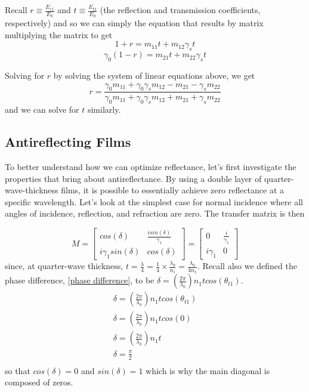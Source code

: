 Recall $r \equiv \frac{E_{r1}}{E_0}$ and $t \equiv \frac{E_{t2}}{E_0}$ (the reflection and transmission coefficients, respectively) and so we can simply the equation that results by matrix multiplying the matrix to get
\begin{equation}
1 + r = m_{11}t + m_{12}\gamma_st
\end{equation}
\begin{equation}
\gamma_0(1 - r) = m_{21}t + m_{22}\gamma_st
\end{equation}

Solving for $r$ by solving the system of linear equations above, we get
\begin{equation}\label{reflection coefficient in terms of transfer matrix terms}
r=\frac{\gamma_0m_{11} + \gamma_0\gamma_sm_{12} - m_{21} - \gamma_sm_{22}}{\gamma_0m_{11} + \gamma_0\gamma_sm_{12} + m_{21} + \gamma_sm_{22}}
\end{equation}
and we can solve for $t$ similarly.

\subsection{Antireflecting Films}
To better understand how we can optimize reflectance, let's first investigate the properties that bring about antireflectance. By using a double layer of quarter-wave-thickness films, it is possible to essentially achieve zero reflectance at a specific wavelength. Let's look at the simplest case for normal incidence where all angles of incidence, reflection, and refraction are zero. The transfer matrix is then

\[
M = 
    \begin{bmatrix}
    cos(\delta) & \frac{isin(\delta)}{\gamma_1}    \\
    i\gamma_1sin(\delta) & cos(\delta)
    \end{bmatrix} = 
    \begin{bmatrix}
    0 & \frac{i}{\gamma_1}  \\
    i\gamma_1 & 0
  \end{bmatrix}
\]
since, at quarter-wave thickness, $t=\frac{\lambda}{4} = \frac{1}{4} \times \frac{\lambda_0}{n_1} = \frac{\lambda_0}{4n_1}$. Recall also we defined the phase difference, \ref{phase difference}, to be $\delta = \left(\frac{2\pi}{\lambda_0}\right) n_1tcos(\theta_{t1})$.
\begin{align*}
    \delta = \left(\frac{2\pi}{\lambda_0}\right) n_1tcos(\theta_{t1})\\
    \delta = \left(\frac{2\pi}{\lambda_0}\right) n_1tcos(0) \\
    \delta = \left(\frac{2\pi}{\lambda_0}\right) n_1t\\
    \delta = \frac{\pi}{2} \\
\end{align*} so that $cos(\delta) = 0$ and $sin(\delta) = 1$ which is why the main diagonal is composed of zeros.

